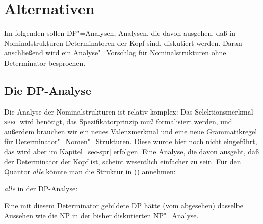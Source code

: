 

\section{Alternativen}

Im folgenden sollen DP"=Analysen, \dash Analysen, die davon ausgehen, daß in Nominalstrukturen
Determinatoren der Kopf sind, diskutiert werden. Daran anschließend wird ein Analyse"=Vorschlag
für Nominalstrukturen ohne Determinator besprochen.

\subsection{Die DP-Analyse}
\label{sec-dp-analyse}

\mbox{}%
Die Analyse der Nominalstrukturen ist relativ komplex: Das Selektionsmerkmal \textsc{spec} wird benötigt,
das Spezifikatorprinzip muß formalisiert werden, und außerdem brauchen wir ein neues
Valenzmerkmal und eine neue Grammatikregel für Determinator"=Nomen"=Strukturen.
Diese wurde hier noch nicht eingeführt, das wird aber im Kapitel~\ref{sec-spr}
erfolgen. Eine Analyse, die davon ausgeht, daß der Determinator der Kopf ist, scheint wesentlich
einfacher zu sein. Für den Quantor \emph{alle} könnte man die Struktur in () annehmen:

\eas
\emph{alle} in der DP-Analyse:\\
\zs

\noindent
Eine mit diesem Determinator gebildete DP hätte (vom \headw abgesehen) dasselbe Aussehen
wie die NP in der bisher diskutierten NP"=Analyse.


